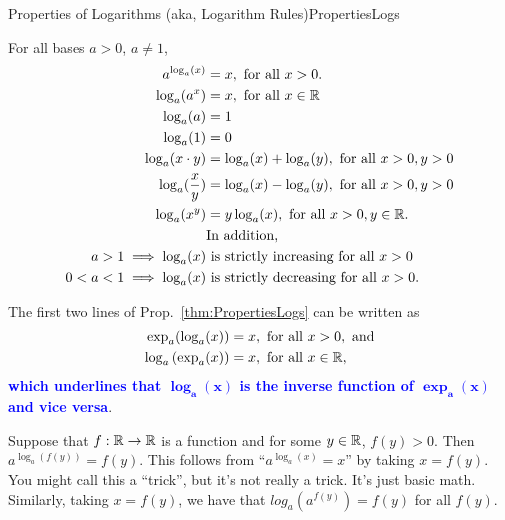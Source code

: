 \begin{propColor}{Properties of Logarithms (aka, Logarithm Rules)}{PropertiesLogs}

For all bases $a > 0$, $a \neq 1$, 
\begin{equation}
\label{eq:PropertiesLogarithms} 
    \begin{aligned}
        a^{\log_a(x)} &=x, \text{ for all } x>0. \\
        \log_a(a^x) &=x, \text{ for all } x \in \mathbb R \\ 
        \log_a(a) &=1 \\
        \log_a(1) &=0 \\
        \log_a(x \cdot y) &= \log_a(x) + \log_a(y), \text{ for all } x>0, y>0 \\
        \log_a(\frac{x}{y}) &= \log_a(x) - \log_a(y), \text{ for all } x>0, y>0 \\
         \log_a(x^y) &= y\log_a(x), \text{ for all } x>0, y \in \mathbb R.\\
         & \text{In addition,}\\
             a> 1 \implies \log_a(x) & \text{ is strictly increasing for all }x>0\\
   0< a< 1 \implies \log_a(x) & \text{ is strictly decreasing for all }x>0.
    \end{aligned}
\end{equation}
\end{propColor}

\begin{rem}
The first two lines of Prop.~\ref{thm:PropertiesLogs} can be written as
\begin{equation}
    \begin{aligned}
                    \exp_a({\log_a(x)}) &=x, \text{ for all } x>0, \text{ and} \\
                  \log_a\left(\exp_a(x) \right) &=x, \text{ for all } x \in \mathbb R, 
    \end{aligned}
\end{equation}
\textcolor{blue}{\bf which underlines that $\bm{\log_a(x)}$ is the inverse function of $\bm{\exp_a(x)}$ and vice versa}. \Qed
\end{rem}

\begin{rem}
    Suppose that $f:\mathbb R \to \mathbb R$ is a function and for some $y \in \mathbb R$, $f(y) >0$. Then $a^{\log_a\left(f(y)\right)} = f(y)$. This follows from ``$a^{\log_a(x)} =x$'' by taking $x = f(y)$. You might call this a ``trick'', but it's not really a trick. It's just basic math. Similarly, taking $x = f(y)$, we have that $log_a(a^{f(y)})= f(y)$ for all $f(y)$. 
    \Qed
\end{rem}

